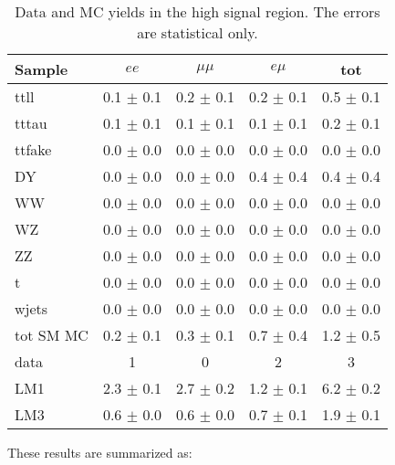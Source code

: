 \begin{table}[hbt]
\begin{center}
\caption{\label{tab:sigyield3} Data and MC yields in the high \Ht signal region.
The errors are statistical only.}
\begin{tabular}{l|cccc}
\hline
         Sample   &           $ee$   &       $\mu\mu$   &         $e\mu$   &            tot  \\
\hline
           ttll   &  0.1 $\pm$ 0.1   &  0.2 $\pm$ 0.1   &  0.2 $\pm$ 0.1   &  0.5 $\pm$ 0.1  \\
          tttau   &  0.1 $\pm$ 0.1   &  0.1 $\pm$ 0.1   &  0.1 $\pm$ 0.1   &  0.2 $\pm$ 0.1  \\
         ttfake   &  0.0 $\pm$ 0.0   &  0.0 $\pm$ 0.0   &  0.0 $\pm$ 0.0   &  0.0 $\pm$ 0.0  \\
             DY   &  0.0 $\pm$ 0.0   &  0.0 $\pm$ 0.0   &  0.4 $\pm$ 0.4   &  0.4 $\pm$ 0.4  \\
             WW   &  0.0 $\pm$ 0.0   &  0.0 $\pm$ 0.0   &  0.0 $\pm$ 0.0   &  0.0 $\pm$ 0.0  \\
             WZ   &  0.0 $\pm$ 0.0   &  0.0 $\pm$ 0.0   &  0.0 $\pm$ 0.0   &  0.0 $\pm$ 0.0  \\
             ZZ   &  0.0 $\pm$ 0.0   &  0.0 $\pm$ 0.0   &  0.0 $\pm$ 0.0   &  0.0 $\pm$ 0.0  \\
              t   &  0.0 $\pm$ 0.0   &  0.0 $\pm$ 0.0   &  0.0 $\pm$ 0.0   &  0.0 $\pm$ 0.0  \\
          wjets   &  0.0 $\pm$ 0.0   &  0.0 $\pm$ 0.0   &  0.0 $\pm$ 0.0   &  0.0 $\pm$ 0.0  \\
\hline
      tot SM MC   &  0.2 $\pm$ 0.1   &  0.3 $\pm$ 0.1   &  0.7 $\pm$ 0.4   &  1.2 $\pm$ 0.5  \\
\hline
           data   &              1   &              0   &              2   &              3  \\
\hline
            LM1   &  2.3 $\pm$ 0.1   &  2.7 $\pm$ 0.2   &  1.2 $\pm$ 0.1   &  6.2 $\pm$ 0.2  \\
            LM3   &  0.6 $\pm$ 0.0   &  0.6 $\pm$ 0.0   &  0.7 $\pm$ 0.1   &  1.9 $\pm$ 0.1  \\
\hline
\end{tabular}
\end{center}
\end{table}

\newpage

These results are summarized as:

